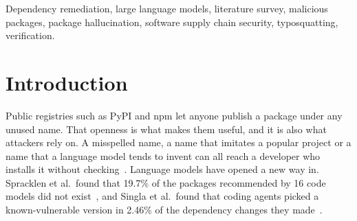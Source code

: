 \documentclass[conference]{IEEEtran}
\begin{document}
\maketitle
\begin{abstract}
Developers now let language models write their code, pick their dependencies and tell them how to fix a package
that a scanner has flagged. Each of these steps can open the door to a software supply-chain attack. In this paper
we survey 36 sources on package hallucination, typosquatting and package confusion, malicious-package detection,
dependency remediation, and the grounding and verification of model output. For each study we summarize what it
measured and what it found, we compare the closest studies on the tasks and label families they cover, and we
identify six research gaps. The picture is clear. Detection is mature, and hallucinated and vulnerable
dependencies are well measured during code generation. The step that comes after detection, the fix a model
recommends, has hardly been examined: no study checks whether that fix is safe across label families, whether its
reasons are backed by evidence, or what an independent verifier adds. Building on these gaps, we propose a
five-agent architecture in which only one agent uses a language model and a separate rule-based agent checks every
recommendation before it reaches the developer, together with a plan for evaluating it.
\end{abstract}

\begin{IEEEkeywords}
Dependency remediation, large language models, literature survey, malicious packages, package hallucination,
software supply chain security, typosquatting, verification.
\end{IEEEkeywords}

\section{Introduction}
Public registries such as PyPI and npm let anyone publish a package under any unused name. That openness is what
makes them useful, and it is also what attackers rely on. A misspelled name, a name that imitates a popular
project or a name that a language model tends to invent can all reach a developer who installs it without
checking~\cite{ladisa2023,ohm2020}. Language models have opened a new way in. Spracklen et al.\ found that 19.7\%
of the packages recommended by 16 code models did not exist~\cite{spracklen2025}, and Singla et al.\ found that
coding agents picked a known-vulnerable version in 2.46\% of the dependency changes they made~\cite{singla2026}.
\end{document}
